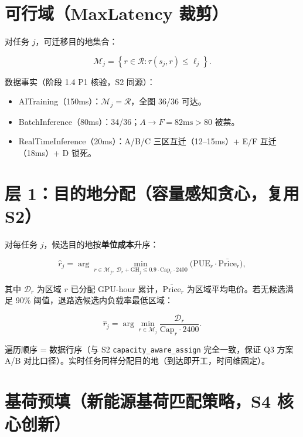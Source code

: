 \documentclass{internal-report}
\begin{document}
\section{可行域（MaxLatency 裁剪）}

对任务 $j$，可迁移目的地集合：

\begin{equation}
  \mathcal{M}_j = \left\{ r \in \mathcal{R} : \tau(s_j, r) \le \ell_j \right\}.
  \label{eq:reach}
\end{equation}

数据事实（阶段 1.4 P1 核验，S2 同源）：
\begin{itemize}
  \item AITraining（150ms）：$\mathcal{M}_j=\mathcal{R}$，全图 36/36 可达。
  \item BatchInference（80ms）：34/36；$A\to F=82\text{ms}>80$ 被禁。
  \item RealTimeInference（20ms）：A/B/C 三区互迁（12--15ms）+ E/F 互迁（18ms）+ D 锁死。
\end{itemize}

\section{层 1：目的地分配（容量感知贪心，复用 S2）}

对每任务 $j$，候选目的地按\textbf{单位成本}升序：

\begin{equation}
  \hat{r}_j = \arg\min_{r \in \mathcal{M}_j,\; \mathcal{D}_r + \text{GH}_j \le 0.9 \cdot \text{Cap}_r \cdot 2400}
  \Big( \text{PUE}_r \cdot \bar{\text{Price}}_r \Big),
  \label{eq:assign}
\end{equation}

其中 $\mathcal{D}_r$ 为区域 $r$ 已分配 GPU-hour 累计，$\bar{\text{Price}}_r$ 为区域平均电价。若无候选满足 90\% 阈值，退路选候选内负载率最低区域：

\begin{equation}
  \hat{r}_j = \arg\min_{r \in \mathcal{M}_j} \frac{\mathcal{D}_r}{\text{Cap}_r \cdot 2400}.
  \label{eq:fallback}
\end{equation}

遍历顺序 = 数据行序（与 S2 \texttt{capacity\_aware\_assign} 完全一致，保证 Q3 方案 A/B 对比口径）。实时任务同样分配目的地（到达即开工，时间维固定）。

\section{基荷预填（新能源基荷匹配策略，S4 核心创新）}
\end{document}

